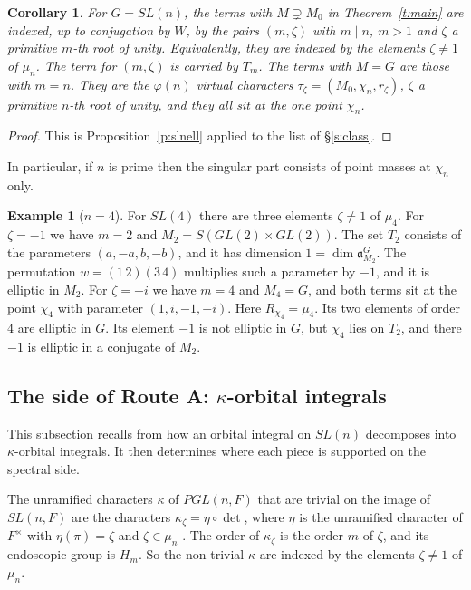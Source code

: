 \documentclass[12pt,letterpaper]{article}
\numberwithin{equation}{section}
\theoremstyle{plain}
\newtheorem{corollary}[theorem]{Corollary}
\theoremstyle{definition}
\newtheorem{example}[theorem]{Example}
\theoremstyle{remark}
\newcommand{\fa}{\mathfrak{a}}
\begin{document}
\begin{corollary}\label{c:slnindex}
For $G=SL(n)$, the terms with $M\supsetneq M_0$ in Theorem~\ref{t:main} are indexed, up to conjugation by $W$, by the pairs $(m,\zeta)$ with $m\mid n$, $m>1$ and $\zeta$ a primitive $m$-th root of unity. Equivalently, they are indexed by the elements $\zeta\ne1$ of $\mu_n$. The term for $(m,\zeta)$ is carried by $T_m$. The terms with $M=G$ are those with $m=n$. They are the $\varphi(n)$ virtual characters $\tau_\zeta=(M_0,\chi_n,r_\zeta)$, $\zeta$ a primitive $n$-th root of unity, and they all sit at the one point $\chi_n$.
\end{corollary}

\begin{proof}
This is Proposition~\ref{p:slnell} applied to the list of \S\ref{s:class}.
\end{proof}

In particular, if $n$ is prime then the singular part consists of point masses at $\chi_n$ only.

\begin{example}[$n=4$]\label{ex:sl4}
For $SL(4)$ there are three elements $\zeta\ne1$ of $\mu_4$. For $\zeta=-1$ we have $m=2$ and $M_2=S(GL(2)\times GL(2))$. The set $T_2$ consists of the parameters $(a,-a,b,-b)$, and it has dimension $1=\dim\fa_{M_2}^G$. The permutation $w=(1\,2)(3\,4)$ multiplies such a parameter by $-1$, and it is elliptic in $M_2$. For $\zeta=\pm i$ we have $m=4$ and $M_4=G$, and both terms sit at the point $\chi_4$ with parameter $(1,i,-1,-i)$. Here $R_{\chi_4}=\mu_4$. Its two elements of order $4$ are elliptic in $G$. Its element $-1$ is not elliptic in $G$, but $\chi_4$ lies on $T_2$, and there $-1$ is elliptic in a conjugate of $M_2$.
\end{example}

\subsection{The side of Route A: \texorpdfstring{$\kappa$}{kappa}-orbital integrals}\label{s:slnkappa}

This subsection recalls from \cite[\S5]{JC26} how an orbital integral on $SL(n)$ decomposes into $\kappa$-orbital integrals. It then determines where each piece is supported on the spectral side.

The unramified characters $\kappa$ of $PGL(n,F)$ that are trivial on the image of $SL(n,F)$ are the characters $\kappa_\zeta=\eta\circ\det$, where $\eta$ is the unramified character of $F^\times$ with $\eta(\pi)=\zeta$ and $\zeta\in\mu_n$ \cite[\S5.1]{JC26}. The order of $\kappa_\zeta$ is the order $m$ of $\zeta$, and its endoscopic group is $H_m$. So the non-trivial $\kappa$ are indexed by the elements $\zeta\ne1$ of $\mu_n$.
\end{document}
